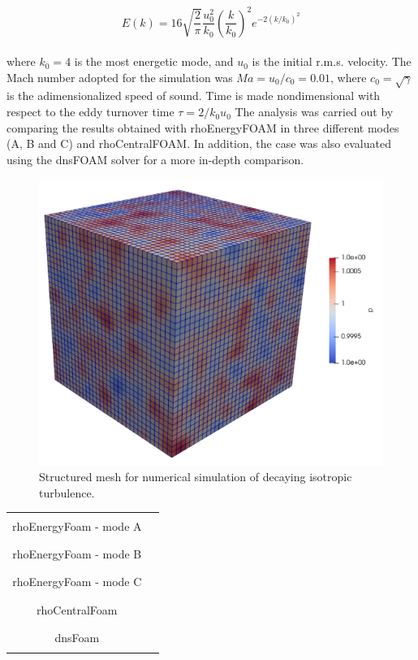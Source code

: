 \documentclass[a5paper]{sapthesis}
\begin{document}
	\begin{equation}
		E(k) = 16 \sqrt{\frac{2}{\pi}} \frac{u_0^2}{k_0} \left( \frac{k}{k_0} \right )^2 e^{-2(k/k_0)^2}
	\end{equation}
	\\
	where $k_0 = 4$ is the most energetic mode, and $u_0$ is the initial r.m.s. velocity. The Mach number adopted for the simulation was $ Ma= u_0/c_0= 0.01$, where $c_0 = \sqrt{\gamma}$ is the adimensionalized speed of sound. Time is made nondimensional with respect to the eddy turnover time $\tau = 2/k_0 u_0$
	The analysis was carried out by comparing the results obtained with rhoEnergyFOAM in three different modes (A, B and C) and rhoCentralFOAM. In addition, the case was also evaluated using the dnsFOAM solver for a more in-depth comparison.
	
	\begin{figure}
		\centering
		\hspace{20mm}
		\includegraphics[width=0.7\linewidth]{Figures/DIT}
		\caption{Structured mesh for numerical simulation of decaying isotropic turbulence.}
		\label{DIT_mesh}
	\end{figure}
	
	\begin{table}
		\centering
		\begin{tabular}{cc}
			\toprule
			rhoEnergyFoam - mode A &  \textcolor{black}{\rule{0.05\linewidth}{0.75mm}} \\
			rhoEnergyFoam - mode B &  \textcolor{blue}{\rule{0.05\linewidth}{0.75mm}} \\
			rhoEnergyFoam - mode C &  \textcolor{red}{\rule{0.05\linewidth}{0.75mm}} \\
			rhoCentralFoam	  	   &  \textcolor{magenta}{\rule{0.05\linewidth}{0.75mm}} \\
			dnsFoam			       &  \textcolor{green}{\rule{0.05\linewidth}{0.75mm}} \\
			\bottomrule
		\end{tabular}
	\end{table}
	
\end{document}
